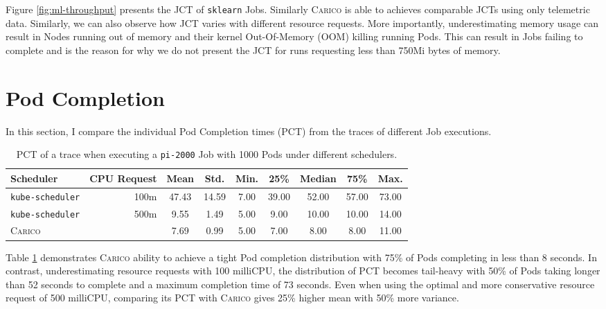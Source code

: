 Figure \ref{fig:ml-throughput} presents the JCT of \texttt{sklearn}
Jobs. Similarly \textsc{Carico} is able to achieves comparable JCTs using only
telemetric data. Similarly, we can also observe how JCT varies with different
resource requests. More importantly, underestimating memory usage can result in
Nodes running out of memory and their kernel Out-Of-Memory (OOM) killing running Pods.
This can result in Jobs failing to complete and is the reason for why we do not
present the JCT for runs requesting less than 750Mi bytes of memory.

\section{Pod Completion}
\label{sec:eval-pod-completion}
In this section, I compare the individual Pod Completion times (PCT) from the
traces of different Job executions.

\begin{table}[h!]
\centering
    \begin{tabular}{|l|r|c|c|c|c|c|c|c|}
    \hline
        \bfseries Scheduler & \bfseries CPU Request & \bfseries Mean & \bfseries Std. &
        \bfseries Min. & \bfseries 25\% & \bfseries Median & \bfseries 75\% & \bfseries Max. \\
    \hline
        \texttt{kube-scheduler} & 100m & 47.43 & 14.59 & 7.00 & 39.00 & 52.00 & 57.00 & 73.00
        \\
        \texttt{kube-scheduler} & 500m & 9.55 & 1.49 & 5.00 & 9.00 & 10.00 & 10.00 & 14.00
        \\
        \textsc{Carico} & & 7.69 & 0.99 & 5.00 & 7.00 & 8.00 & 8.00 & 11.00 \\
    \hline
    \end{tabular}
    \caption{PCT of a trace when executing a \texttt{pi-2000} Job
    with 1000 Pods under different schedulers.}
    \label{tab:cpu-pod-completions}
\end{table}

Table \ref{tab:cpu-pod-completions} demonstrates \textsc{Carico} ability to
achieve a tight Pod completion distribution with 75\% of Pods completing in less
than 8 seconds. In contrast, underestimating resource requests with 100
milliCPU, the distribution of PCT becomes tail-heavy with 50\% of Pods taking
longer than 52 seconds to complete and a maximum completion time of 73 seconds.
Even when using the optimal and more conservative resource request of 500
milliCPU, comparing its PCT with \textsc{Carico} gives 25\% higher mean with
50\% more variance.

